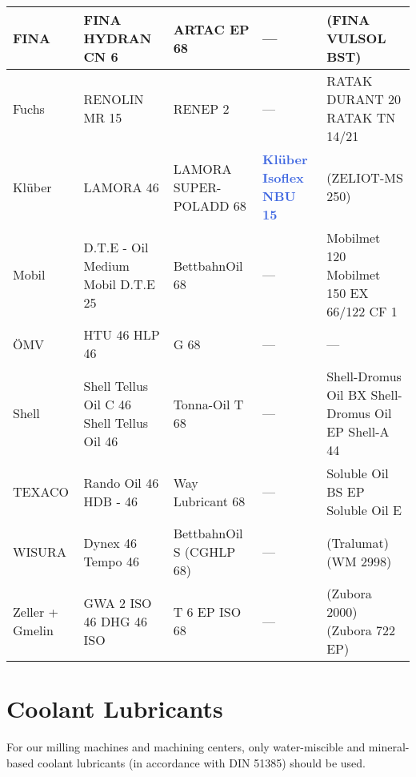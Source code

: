\begin{longtable}{|p{2.2cm}|p{2.7cm}|p{3cm}|p{3cm}|p{4.5cm}|}
    \hline
    FINA & FINA \newline HYDRAN CN 6 & ARTAC EP 68 & --- & (FINA VULSOL BST) \\
    \hline
    Fuchs & RENOLIN MR 15 & RENEP 2 & --- & RATAK DURANT 20 \newline RATAK TN 14/21 \\
    \hline
    Klüber & LAMORA 46 & LAMORA SUPER-POLADD 68 & \textcolor{RoyalBlue}{\textbf{Klüber Isoflex NBU 15}} & (ZELIOT-MS 250) \\
    \hline
    Mobil & D.T.E - Oil Medium \newline Mobil D.T.E 25 & BettbahnOil 68 & --- & Mobilmet 120 \newline Mobilmet 150 \newline EX 66/122 CF 1 \\
    \hline
    ÖMV & HTU 46 \newline HLP 46 & G 68 & --- & --- \\
    \hline
    Shell & Shell Tellus Oil C 46 \newline Shell Tellus Oil 46 & Tonna-Oil T 68 & --- & Shell-Dromus Oil BX \newline Shell-Dromus Oil EP \newline Shell-A 44 \\
    \hline
    TEXACO & Rando Oil 46 \newline HDB - 46 & Way Lubricant 68 & --- & Soluble Oil BS EP \newline Soluble Oil E \\
    \hline
    WISURA & Dynex 46 \newline Tempo 46 & BettbahnOil \newline 68 S (CGHLP 68) & --- & (Tralumat) \newline (WM 2998) \\
    \hline
    Zeller + Gmelin & GWA 2 ISO 46 \newline DHG 46 ISO & T 6 EP ISO 68 & --- & (Zubora 2000) \newline (Zubora 722 EP) \\
    \hline
\end{longtable}

\section{Coolant Lubricants\protect\footnotemark[1]}

For our milling machines and machining centers, only water-miscible and mineral-based coolant lubricants (in accordance with DIN 51385) should be used.

